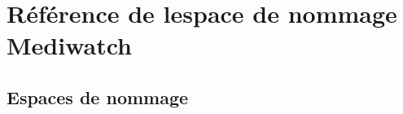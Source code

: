 \hypertarget{namespace_mediwatch}{}\section{Référence de l\textquotesingle{}espace de nommage Mediwatch}
\label{namespace_mediwatch}
\subsection*{Espaces de nommage}
\begin{DoxyCompactItemize}
\end{DoxyCompactItemize}
